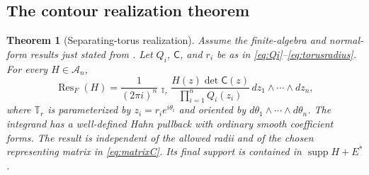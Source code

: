 \documentclass[11pt,letterpaper]{article}
\newtheorem{theorem}{Theorem}[section]
\theoremstyle{definition}
\theoremstyle{remark}
\newcommand{\Acal}{\mathscr A}
\newcommand{\supp}{\operatorname{supp}}
\newcommand{\Res}{\operatorname{Res}}
\newcommand{\HInt}{\mathop{\int^{\!H}}\nolimits}
\numberwithin{equation}{section}
\begin{document}
\subsection{The contour realization theorem}
\begin{theorem}[Separating-torus realization]\label{thm:torus}
Assume the finite-algebra and normal-form results just stated from \cite{AG}. Let $Q_i$, $\mathsf C$, and $r_i$ be as in \eqref{eq:Qi}--\eqref{eq:torusradius}. For every $H\in\Acal_n$,
\begin{equation}\label{eq:torus}
\boxed{\quad
\Res_F(H)=\frac1{(2\pi i)^n}
\HInt_{\mathbb T_r}
 \frac{H(z)\det\mathsf C(z)}{\prod_{i=1}^nQ_i(z_i)}
 \,dz_1\wedge\cdots\wedge dz_n,
\quad}
\end{equation}
where $\mathbb T_r$ is parameterized by $z_i=r_i e^{i\theta_i}$ and oriented by $d\theta_1\wedge\cdots\wedge d\theta_n$. The integrand has a well-defined Hahn pullback with ordinary smooth coefficient forms. The result is independent of the allowed radii and of the chosen representing matrix in \eqref{eq:matrixC}. Its final support is contained in $\supp H+E^*$.
\end{theorem}
\end{document}
